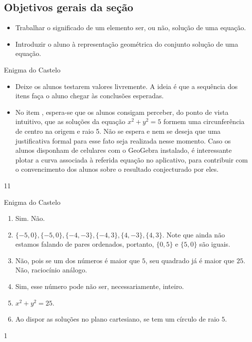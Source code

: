 \def\currentcolor{session1}
\begin{texto}
{\subsection{Objetivos gerais da seção}
\begin{itemize}
\item Trabalhar o significado de um elemento ser, ou não, solução de uma equação.
\item Introduzir o aluno à representação geométrica do conjunto solução de uma equação.
\end{itemize}
}
\end{texto}
\begin{sugestions}{Enigma do Castelo}
{
\begin{itemize}
\item Deixe os alunos testarem valores livremente. A ideia é que a sequência dos itens faça o aluno chegar às conclusões esperadas.
\item No item , espera-se que os alunos consigam perceber, do ponto de vista intuitivo, que as soluções da equação $x^2+y^2=5$ formem uma circunferência de centro na origem e raio 5. Não se espera e nem se deseja que uma justificativa formal para esse fato seja realizada nesse momento. Caso os alunos disponham de celulares com o GeoGebra instalado, é interessante plotar a curva associada à referida equação no aplicativo, para contribuir com o convencimento dos alunos sobre o resultado conjecturado por eles.
\end{itemize}
}{1}{1}
\end{sugestions}
\begin{answer}{Enigma do Castelo}
{
\begin{enumerate}
\item Sim. Não.
\item $\{-5,0\},\{-5,0\},\{-4, -3\}, \{-4,3\}, \{4, -3\}, \{4, 3\}$. Note que ainda não estamos falando de pares ordenados, portanto, $\{0,5\}$ e $\{5,0\}$ são iguais.
\item Não, pois se um dos números é maior que $5$, seu quadrado já é maior que $25$.  Não, raciocínio análogo.
\item Sim, esse número pode não ser, necessariamente, inteiro.
\item $x^2+y^2=25$.
\item Ao dispor as soluções no plano cartesiano, se tem um círculo de raio $5$.
\end{enumerate}
}{1}
\end{answer}

